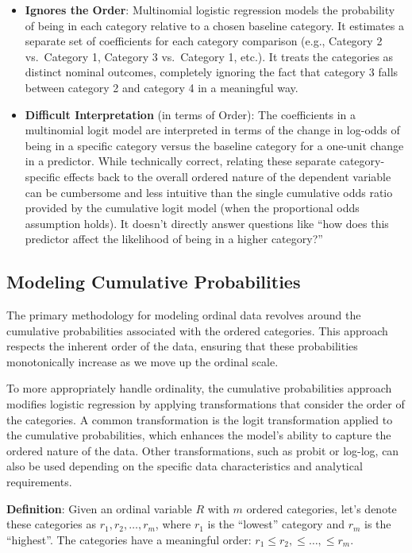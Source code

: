 \documentclass[
  letterpaper,
  DIV=11,
  numbers=noendperiod]{scrartcl}
\begin{document}
\begin{itemize}
\item
  \textbf{Ignores the Order}: Multinomial logistic regression models the
  probability of being in each category relative to a chosen baseline
  category. It estimates a separate set of coefficients for each
  category comparison (e.g., Category 2 vs.~Category 1, Category 3
  vs.~Category 1, etc.). It treats the categories as distinct nominal
  outcomes, completely ignoring the fact that category 3 falls between
  category 2 and category 4 in a meaningful way.
\item
  \textbf{Difficult Interpretation} (in terms of Order): The
  coefficients in a multinomial logit model are interpreted in terms of
  the change in log-odds of being in a specific category versus the
  baseline category for a one-unit change in a predictor. While
  technically correct, relating these separate category-specific effects
  back to the overall ordered nature of the dependent variable can be
  cumbersome and less intuitive than the single cumulative odds ratio
  provided by the cumulative logit model (when the proportional odds
  assumption holds). It doesn't directly answer questions like ``how
  does this predictor affect the likelihood of being in a higher
  category?''
\end{itemize}

\hypertarget{modeling-cumulative-probabilities}{%
\subsection{Modeling Cumulative
Probabilities}\label{modeling-cumulative-probabilities}}

The primary methodology for modeling ordinal data revolves around the
cumulative probabilities associated with the ordered categories. This
approach respects the inherent order of the data, ensuring that these
probabilities monotonically increase as we move up the ordinal scale.

To more appropriately handle ordinality, the cumulative probabilities
approach modifies logistic regression by applying transformations that
consider the order of the categories. A common transformation is the
logit transformation applied to the cumulative probabilities, which
enhances the model's ability to capture the ordered nature of the data.
Other transformations, such as probit or log-log, can also be used
depending on the specific data characteristics and analytical
requirements.

\textbf{Definition}: Given an ordinal variable \(R\) with \(m\) ordered
categories, let's denote these categories as \(r_1, r_2, \dots, r_m\),
where \(r_1\) is the ``lowest'' category and \(r_m\) is the ``highest''.
The categories have a meaningful order:
\(r_1 \leq r_2, \leq \dots, \leq r_m\).
\end{document}
